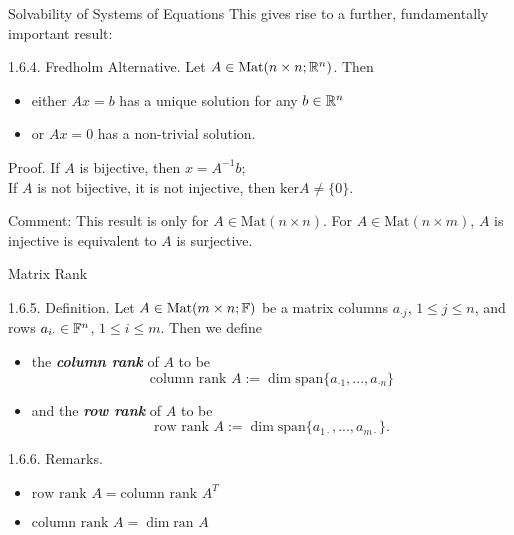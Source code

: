 \documentclass[hyperref={pdfpagelabels=true}]{beamer}
\newcommand{\Mat}{\text{Mat}}
\newcommand{\highlightg}[1]{\textcolor[rgb]{0.1,0.5,0.3}{\emph{\textbf{#1}}}}
\newcommand{\<}{\langle}
\renewcommand{\>}{\rangle}
\begin{document}
\begin{frame}{Solvability of Systems of Equations}
    This gives rise to a further, fundamentally important result:
    \begin{block}{1.6.4. Fredholm Alternative.}
        Let $A \in \Mat(n \times n;\R^{n})$. Then
        \begin{itemize}
            \item either $Ax = b$ has a unique solution for any $b \in \mathbb{R}^{n}$
            \item or $Ax = 0$ has a non-trivial solution.
        \end{itemize}
    \end{block}
    \begin{block}{Proof.}
        If $A$ is bijective, then $x = A^{-1}b$;\\
        If $A$ is not bijective, it is not injective, then $\text{ker}A \neq \{0\}$.
    \end{block}
    \begin{block}{Comment:}
        This result is only for $A \in \Mat(n \times n)$. For $A \in \Mat(n \times m)$, $A$ is injective is equivalent to $A$ is surjective.
    \end{block}
\end{frame}
\begin{frame}{Matrix Rank}
    \begin{block}{1.6.5. Definition.}
        Let $A \in \Mat(m \times n;\F)$ be a matrix columns $a_{\cdot j}$, $1 \leq j \leq n$, and rows $a_{i \cdot} \in \mathbb{F}^{n}$, $1 \leq i \leq m$. Then we define
        \begin{itemize}
            \item the \highlightg{column rank} of $A$ to be 
            \[\text{column rank }A:=\dim \text{span}\{a_{\cdot 1},...,a_{\cdot n}\}\]
            \item and the \highlightg{row rank} of $A$ to be 
            \[\text{row rank }A:=\dim \text{span}\{a_{1 \cdot},...,a_{m \cdot}\}.\]
        \end{itemize}
    \end{block}
    \begin{block}{1.6.6. Remarks.}
        \begin{itemize}
            \item $\text{row rank }A = \text{column rank }A^{T}$
            \item $\text{column rank }A = \dim \text{ran }A$
        \end{itemize}
    \end{block}
\end{frame}
\end{document}
